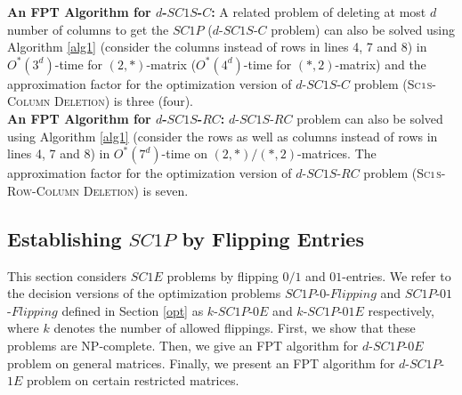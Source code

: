 \documentclass[review, 1p]{elsarticle}
\begin{document}
\noindent \textbf{An FPT Algorithm for $d$-$SC1S$-$C$: \newline}
A related problem of deleting at most $d$ number of columns to get the $SC1P$ ($d$-$SC1S$-$C$ problem) can also be solved using Algorithm \ref{alg1} (consider the columns instead of rows in lines 4, 7 and 8) in $O^{*}(3^{d})$-time for $(2,*)$-matrix ($O^{*}(4^{d})$-time for $(*,2)$-matrix) and the approximation factor for the optimization version of $d$-$SC1S$-$C$ problem \textup{(\textsc{Sc$\mathsmaller 1$s-Column Deletion})} is three (four).\\

\noindent \textbf{An FPT Algorithm for $d$-$SC1S$-$RC$: \newline}
 $d$-$SC1S$-$RC$ problem can also be solved using Algorithm \ref{alg1} (consider the rows as well as columns instead of rows in lines 4, 7 and 8) in $O^{*}(7^{d})$-time on $(2,*)/ (*,2)$-matrices. The approximation factor for the optimization version of $d$-$SC1S$-$RC$ problem \textup{(\textsc{Sc$\mathsmaller 1$s-Row-Column Deletion})} is seven.
\subsection{\textup{\textbf{Establishing $SC1P$ by Flipping Entries}}} \label{etrowcolumn}
This section considers $SC1E$ problems by flipping $0/1$ and $01$-entries. We refer to the decision versions of the optimization problems $SC1P$-$0$-$Flipping$ and $SC1P$-$01$-$Flipping$ defined in Section \ref{opt} as $k$-$SC1P$-$0E$ and $k$-$SC1P$-$01E$ respectively, where $k$ denotes the number of allowed flippings. First, we show that these problems are NP-complete. Then, we give an FPT algorithm for $d$-$SC1P$-$0E$ problem on general matrices. Finally, we present an FPT algorithm for $d$-$SC1P$-$1E$ problem on certain restricted matrices. 
\end{document}
